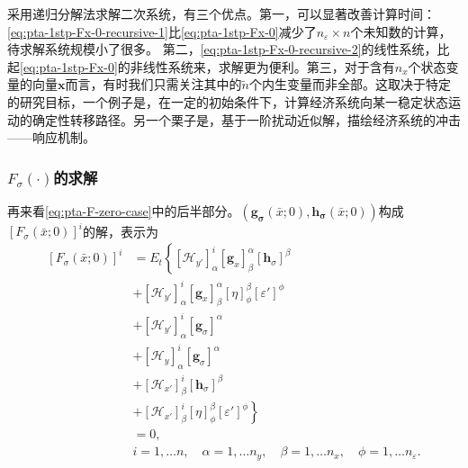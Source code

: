 采用递归分解法求解二次系统，有三个优点。第一，可以显著改善计算时间：\eqref{eq:pta-1stp-Fx-0-recursive-1}比\eqref{eq:pta-1stp-Fx-0}减少了$n_{\varepsilon} \times n$个未知数的计算，待求解系统规模小了很多\citep{RubioRamirez:2008va}。
第二，\eqref{eq:pta-1stp-Fx-0-recursive-2}的线性系统，比起\eqref{eq:pta-1stp-Fx-0}的非线性系统来，求解更为便利。第三，对于含有$n_x$个状态变量的向量$\bm{x}$而言，有时我们只需关注其中的$\tilde{n}$个内生变量而非全部。这取决于特定的研究目标，一个例子是，在一定的初始条件下，计算经济系统向某一稳定状态运动的确定性转移路径。另一个栗子是，基于一阶扰动近似解，描绘经济系统的冲击——响应机制。

\subsubsection{$F_{\sigma}(\cdot)$的求解}
再来看\eqref{eq:pta-F-zero-case}中的后半部分。$\left(\bm{g_\sigma}(\bar{x};0), \bm{h_{\sigma}}(\bar{x};0) \right)$构成$\left[F_{\sigma}(\bar{x};0)\right]^{i}$的解，表示为
\begin{equation}
  \label{eq:pta-1stp-Fsigma-0}
  \begin{split}
    \left[F_\sigma(\bar{x};0)\right]^{i} &= E_t \left\{ \right.
    \left[ \mathcal{H}_{y'} \right]^{i}_{\alpha}
    \left[ \bm{g}_x \right]^{\alpha}_{\beta}
    \left[ \bm{h}_\sigma \right]^{\beta} \\
    &+
    \left[ \mathcal{H}_{y'} \right]^{i}_{\alpha}
    \left[ \bm{g}_x \right]^{\alpha}_{\beta}
    \left[ \eta \right]^{\beta}_{\phi}
    \left[ \varepsilon' \right]^{\phi} \\
    &+
    \left[ \mathcal{H}_{y'} \right]^{i}_{\alpha}
    \left[ \bm{g}_{\sigma} \right]^{\alpha} \\
    &+
    \left[ \mathcal{H}_{y} \right]^{i}_{\alpha}
    \left[ \bm{g}_{\sigma} \right]^{\alpha} \\
    &+
    \left[ \mathcal{H}_{x'} \right]^{i}_{\beta}
    \left[ \bm{h}_{\sigma} \right]^{\beta} \\
    &+
    \left[ \mathcal{H}_{x'} \right]^{i}_{\beta}
    \left[ \eta \right]^{\beta}_{\phi}
    \left[ \varepsilon' \right]^{\phi} \left.\right\}\\
    &= 0, \\
    &i=1,\ldots n, \quad \alpha = 1,\ldots n_y, \quad \beta = 1,\ldots n_x, \quad \phi = 1, \ldots n_{\varepsilon}.
  \end{split}
\end{equation}


